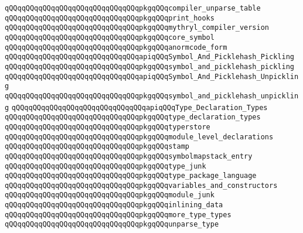 \verb|qQQqqQQqqQQqqQQqqQQqqQQqqQQqqQQqpkgqQQqcompiler_unparse_table|\newline
\verb|qQQqqQQqqQQqqQQqqQQqqQQqqQQqqQQqpkgqQQqprint_hooks|\newline
\verb|qQQqqQQqqQQqqQQqqQQqqQQqqQQqqQQqpkgqQQqmythryl_compiler_version|\newline
\verb|qQQqqQQqqQQqqQQqqQQqqQQqqQQqqQQqpkgqQQqcore_symbol|\newline
\verb|qQQqqQQqqQQqqQQqqQQqqQQqqQQqqQQqpkgqQQqanormcode_form|\newline
\newline
\verb|qQQqqQQqqQQqqQQqqQQqqQQqqQQqqQQqapiqQQqSymbol_And_Picklehash_Pickling|\newline
\verb|qQQqqQQqqQQqqQQqqQQqqQQqqQQqqQQqpkgqQQqsymbol_and_picklehash_pickling|\newline
\newline
\verb|qQQqqQQqqQQqqQQqqQQqqQQqqQQqqQQqapiqQQqSymbol_And_Picklehash_Unpickling|\newline
\verb|qQQqqQQqqQQqqQQqqQQqqQQqqQQqqQQqpkgqQQqsymbol_and_picklehash_unpickling|\newline
\newline
\verb|qQQqqQQqqQQqqQQqqQQqqQQqqQQqqQQqapiqQQqType_Declaration_Types|\newline
\verb|qQQqqQQqqQQqqQQqqQQqqQQqqQQqqQQqpkgqQQqtype_declaration_types|\newline
\newline
\verb|qQQqqQQqqQQqqQQqqQQqqQQqqQQqqQQqpkgqQQqtyperstore|\newline
\verb|qQQqqQQqqQQqqQQqqQQqqQQqqQQqqQQqpkgqQQqmodule_level_declarations|\newline
\verb|qQQqqQQqqQQqqQQqqQQqqQQqqQQqqQQqpkgqQQqstamp|\newline
\verb|qQQqqQQqqQQqqQQqqQQqqQQqqQQqqQQqpkgqQQqsymbolmapstack_entry|\newline
\verb|qQQqqQQqqQQqqQQqqQQqqQQqqQQqqQQqpkgqQQqtype_junk|\newline
\verb|qQQqqQQqqQQqqQQqqQQqqQQqqQQqqQQqpkgqQQqtype_package_language|\newline
\verb|qQQqqQQqqQQqqQQqqQQqqQQqqQQqqQQqpkgqQQqvariables_and_constructors|\newline
\verb|qQQqqQQqqQQqqQQqqQQqqQQqqQQqqQQqpkgqQQqmodule_junk|\newline
\verb|qQQqqQQqqQQqqQQqqQQqqQQqqQQqqQQqpkgqQQqinlining_data|\newline
\verb|qQQqqQQqqQQqqQQqqQQqqQQqqQQqqQQqpkgqQQqmore_type_types|\newline
\verb|qQQqqQQqqQQqqQQqqQQqqQQqqQQqqQQqpkgqQQqunparse_type|\newline
